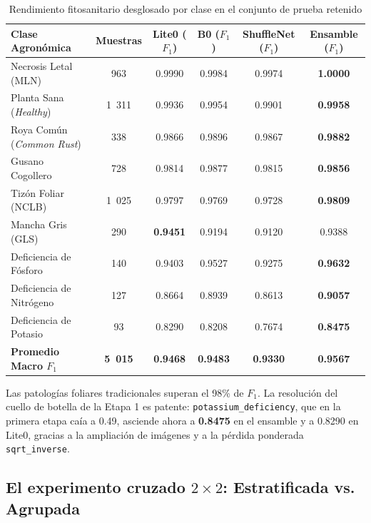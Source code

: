 \documentclass[12pt,letterpaper]{article}
\begin{document}
\begin{table}[H]
\caption{Rendimiento fitosanitario desglosado por clase en el conjunto de prueba retenido}
\label{tab:class_performance}
\centering
\small
\begin{singlespace}
\begin{tabular}{lccccc}
\toprule
\textbf{Clase Agron\'omica} & \textbf{Muestras} & \textbf{Lite0 ($F_1$)} & \textbf{B0 ($F_1$)} & \textbf{ShuffleNet ($F_1$)} & \textbf{Ensamble ($F_1$)} \\
\midrule
Necrosis Letal (MLN) & 963 & 0.9990 & 0.9984 & 0.9974 & \textbf{1.0000} \\
Planta Sana (\textit{Healthy}) & 1~311 & 0.9936 & 0.9954 & 0.9901 & \textbf{0.9958} \\
Roya Com\'un (\textit{Common Rust}) & 338 & 0.9866 & 0.9896 & 0.9867 & \textbf{0.9882} \\
Gusano Cogollero & 728 & 0.9814 & 0.9877 & 0.9815 & \textbf{0.9856} \\
Tiz\'on Foliar (NCLB) & 1~025 & 0.9797 & 0.9769 & 0.9728 & \textbf{0.9809} \\
Mancha Gris (GLS) & 290 & \textbf{0.9451} & 0.9194 & 0.9120 & 0.9388 \\
Deficiencia de F\'osforo & 140 & 0.9403 & 0.9527 & 0.9275 & \textbf{0.9632} \\
Deficiencia de Nitr\'ogeno & 127 & 0.8664 & 0.8939 & 0.8613 & \textbf{0.9057} \\
Deficiencia de Potasio & 93 & 0.8290 & 0.8208 & 0.7674 & \textbf{0.8475} \\
\midrule
\textbf{Promedio Macro $F_1$} & \textbf{5~015} & \textbf{0.9468} & \textbf{0.9483} & \textbf{0.9330} & \textbf{0.9567} \\
\bottomrule
\end{tabular}
\end{singlespace}
\end{table}

Las patolog\'ias foliares tradicionales superan el 98\% de $F_1$. La resoluci\'on del cuello de botella de la Etapa 1 es patente: \texttt{potassium\_deficiency}, que en la primera etapa ca\'ia a 0.49, asciende ahora a \textbf{0.8475} en el ensamble y a 0.8290 en Lite0, gracias a la ampliaci\'on de im\'agenes y a la p\'erdida ponderada \texttt{sqrt\_inverse}.

\subsection{El experimento cruzado $2\times2$: Estratificada vs. Agrupada}
\end{document}

